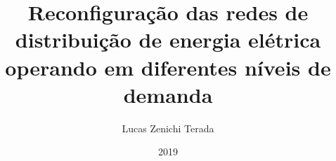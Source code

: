 \documentclass[ABNT, FAPESP]{zentera}
\author{Lucas Zenichi Terada}
\title{Reconfiguração das redes de distribuição de energia elétrica operando em diferentes níveis de demanda}
\date{2019}
\numberwithin{equation}{section}
\begin{document}
\makecover





















\end{document}
